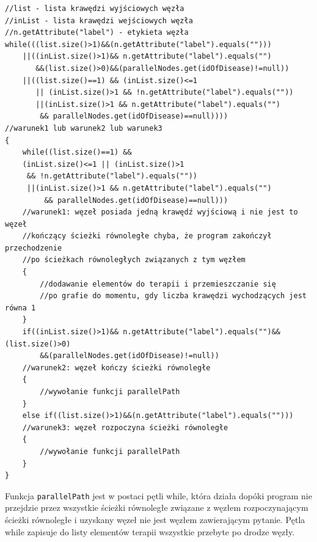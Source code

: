 
\newpage
\begin{verbatim}
//list - lista krawędzi wyjściowych węzła
//inList - lista krawędzi wejściowych węzła
//n.getAttribute("label") - etykieta węzła
while(((list.size()>1)&&(n.getAttribute("label").equals("")))
    ||((inList.size()>1)&& n.getAttribute("label").equals("")
       &&(list.size()>0)&&(parallelNodes.get(idOfDisease)!=null))
    ||((list.size()==1) && (inList.size()<=1 
       || (inList.size()>1 && !n.getAttribute("label").equals(""))
       ||(inList.size()>1 && n.getAttribute("label").equals("")
        && parallelNodes.get(idOfDisease)==null))))
//warunek1 lub warunek2 lub warunek3
{
    while((list.size()==1) && 
    (inList.size()<=1 || (inList.size()>1 
     && !n.getAttribute("label").equals(""))
     ||(inList.size()>1 && n.getAttribute("label").equals("") 
         && parallelNodes.get(idOfDisease)==null)))
    //warunek1: węzeł posiada jedną krawędź wyjściową i nie jest to węzeł 
    //kończący ścieżki równoległe chyba, że program zakończył przechodzenie 
    //po ścieżkach równoległych związanych z tym węzłem
    {
    	//dodawanie elementów do terapii i przemieszczanie się 
    	//po grafie do momentu, gdy liczba krawędzi wychodzących jest równa 1
    }
    if((inList.size()>1)&& n.getAttribute("label").equals("")&&(list.size()>0)
        &&(parallelNodes.get(idOfDisease)!=null))
    //warunek2: węzeł kończy ścieżki równoległe
    {
        //wywołanie funkcji parallelPath
    }
    else if((list.size()>1)&&(n.getAttribute("label").equals("")))
    //warunek3: węzeł rozpoczyna ścieżki równoległe
    {
        //wywołanie funkcji parallelPath
    }
}
\end{verbatim}
\newpage
Funkcja \texttt{parallelPath} jest w postaci pętli while, która działa dopóki program nie przejdzie przez wszystkie ścieżki równoległe związane z węzłem rozpoczynającym ścieżki równoległe i uzyskany węzeł nie jest węzłem zawierającym pytanie. Pętla while zapisuje do listy elementów terapii wszystkie przebyte po drodze węzły. 

